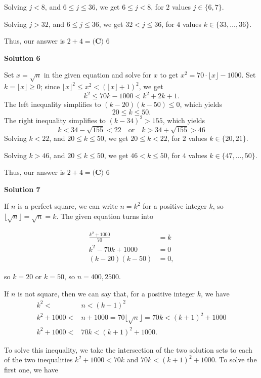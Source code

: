 \begin{enumerate}
 Solving $j < 8$, and $6 \le j \le 36$, we get $6 \le j < 8$, for $2$ values $j\in \{6, 7\}$.

 Solving $j >32$, and $6 \le j \le 36$, we get $32 < j \le 36$, for $4$ values $k\in \{33, \ldots , 36\}$.

 Thus, our answer is $2 + 4 = \boxed{\textbf{(C) }6}$




\textbf{Solution 6}

Set $x=\sqrt{n}$ in the given equation and solve for $x$ to get $x^2 = 70 \cdot \lfloor x \rfloor - 1000$. Set $k = \lfloor x \rfloor \ge 0$; since $\lfloor x \rfloor^2 \le x^2 < (\lfloor x \rfloor + 1)^2$, we get  
 \[k^2 \le  70k - 1000 < k^2 + 2k + 1.\]The left inequality simplifies to $(k-20)(k-50) \le 0$, which yields 
 \[20 \le k \le 50.\]The right inequality simplifies to $(k-34)^2 > 155$, which yields 
 \[k < 34 - \sqrt{155} < 22 \quad \text{or} \quad k > 34 + \sqrt{155} > 46\] Solving $k < 22$, and $20 \le k \le 50$, we get $20 \le k < 22$, for $2$ values $k\in \{20, 21\}$.

 Solving $k >46$, and $20 \le k \le 50$, we get $46 < k \le 50$, for $4$ values $k\in \{47, \ldots , 50\}$.

 Thus, our answer is $2 + 4 = \boxed{\textbf{(C) }6}$




\textbf{Solution 7}

If $n$ is a perfect square, we can write $n = k^2$ for a positive integer $k$, so $\lfloor \sqrt{n} \rfloor = \sqrt{n} = k.$ The given equation turns into 

 \begin{align*}\frac{k^2 + 1000}{70} &= k \\k^2 - 70k + 1000 &= 0 \\(k-20)(k-50) &= 0,\end{align*}


 so $k = 20$ or $k= 50$, so $n = 400, 2500.$

 If $n$ is not square, then we can say that, for a positive integer $k$, we have \begin{align*}k^2 < &n < (k+1)^2 \\k^2 + 1000 < &n + 1000  = 70\lfloor \sqrt{n} \rfloor = 70k< (k+1)^2 + 1000 \\k^2 + 1000 < &70k < (k+1)^2 + 1000.\end{align*}


 To solve this inequality, we take the intersection of the two solution sets to each of the two inequalities $k^2 + 1000 < 70k$ and $70k < (k+1)^2 + 1000$. To solve the first one, we have 


\end{enumerate}

